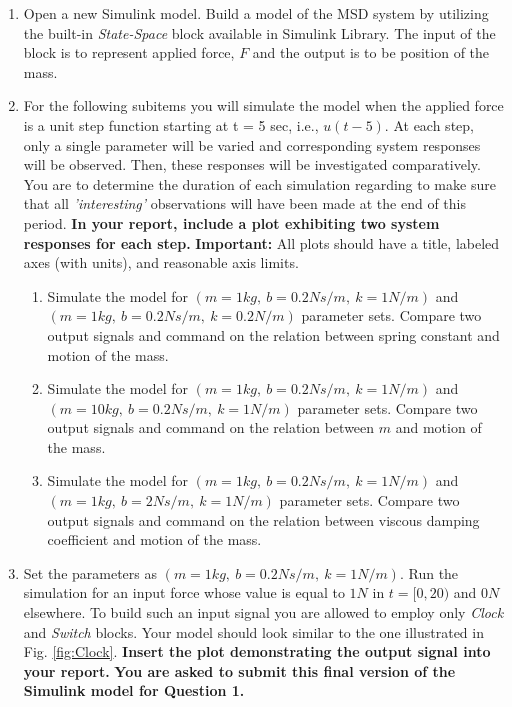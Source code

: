 \documentclass[12pt]{article}
\theoremstyle{plain}
\theoremstyle{definition}
\begin{document}
\begin{enumerate}
\begin{enumerate}
		\item Open a new Simulink model. Build a model of the MSD system by utilizing the built-in \textit{State-Space} block available in Simulink Library. The input of the block is to represent applied force, $F$ and the output is to be position of the mass.
		
		\item For the following subitems you will simulate the model when the applied force is a unit step function starting at t = 5 sec, i.e., $u(t-5)$. At each step, only a single parameter will be varied and corresponding system responses will be observed. Then, these responses will be investigated comparatively. You are to determine the duration of each simulation regarding to make sure that all \textit{'interesting'} observations will have been made at the end of this period.
		\textbf{In your report, include a plot exhibiting two system responses for each step.}		
		\textbf{Important:} All plots should have a title, labeled axes (with units), and reasonable axis limits.

			\begin{enumerate}
				\item Simulate the model for $(m = 1 kg,\ b = 0.2 Ns/m,\ k = 1 N/m)$ and $(m = 1 kg,\ b = 0.2 Ns/m,\ k = 0.2 N/m)$ parameter sets. Compare two output signals and command on the relation between spring constant and motion of the mass.
				\item Simulate the model for $(m = 1 kg,\ b = 0.2 Ns/m,\ k = 1 N/m)$ and $(m = 10 kg,\ b = 0.2 Ns/m,\ k = 1 N/m)$ parameter sets. Compare two output signals and command on the relation between $m$ and motion of the mass.
				\item Simulate the model for $(m = 1 kg,\ b = 0.2 Ns/m,\ k = 1 N/m)$ and $(m = 1 kg,\ b = 2 Ns/m,\ k = 1 N/m)$ parameter sets. Compare two output signals and command on the relation between viscous damping coefficient and motion of the mass.
			\end{enumerate}
				
		\item \label{stepKey} Set the parameters as $(m = 1 kg,\ b = 0.2 Ns/m,\ k = 1 N/m)$. Run the simulation for an input force whose value is equal to $1 N$ in $t = [0, 20)$ and $0 N$ elsewhere.
		To build such an input signal you are allowed to employ only \textit{Clock} and \textit{Switch} blocks. Your model should look similar to the one illustrated in Fig. \ref{fig:Clock}. \textbf{Insert the plot demonstrating the output signal into your report.} \textbf{You are asked to submit this final version of the Simulink model for Question 1.}
		

\end{enumerate}
\end{enumerate}
\end{document}
